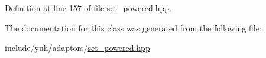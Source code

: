 \-Definition at line 157 of file set\-\_\-powered.\-hpp.



\-The documentation for this class was generated from the following file\-:\begin{DoxyCompactItemize}
\item 
include/yuh/adaptors/\hyperlink{set__powered_8hpp}{set\-\_\-powered.\-hpp}\end{DoxyCompactItemize}
